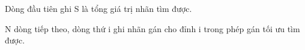 Dòng đầu tiên ghi S là tổng giá trị nhãn tìm được.


N dòng tiếp theo, dòng thứ i ghi nhãn gán cho đỉnh i trong phép gán tối ưu tìm được.